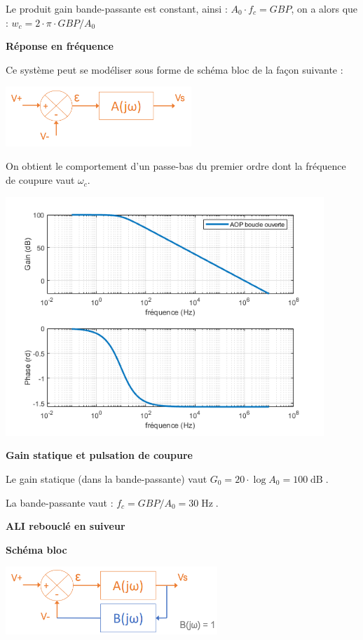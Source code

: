 \documentclass[a4paper,french]{paper}
\begin{document}
Le produit gain bande-passante est constant, ainsi : $A_0 \cdot f_c = GBP$, on a alors que : $w_c = 2 \cdot \pi \cdot GBP / A_0$


\textbf{Réponse en fréquence}

Ce système peut se modéliser sous forme de schéma bloc de la façon suivante :

\begin{center}
	\includegraphics[width=7cm]{images/TD/correction_ALI_BO.png}
\end{center}	
		
On obtient le comportement d'un passe-bas du premier ordre dont la fréquence de coupure vaut $\omega_c$. 
		
\begin{center}
	\includegraphics[width=12cm]{images/TD/correction_ALI_BO_Bode.png}
\end{center}	
 
\textbf{Gain statique et pulsation de coupure}

Le gain statique (dans la bande-passante) vaut $G_0 = 20 \cdot \log{A_0} = 100\operatorname{dB}$.
		
La bande-passante vaut : $f_c = GBP / A_0 = 30\operatorname{Hz}$.


\qquad


\textbf{\large ALI rebouclé en suiveur} 

\textbf{Schéma bloc} 

\begin{center}
	\includegraphics[width=8cm]{images/TD/correction_ALI_BFunit.png}
\end{center}
\end{document}
